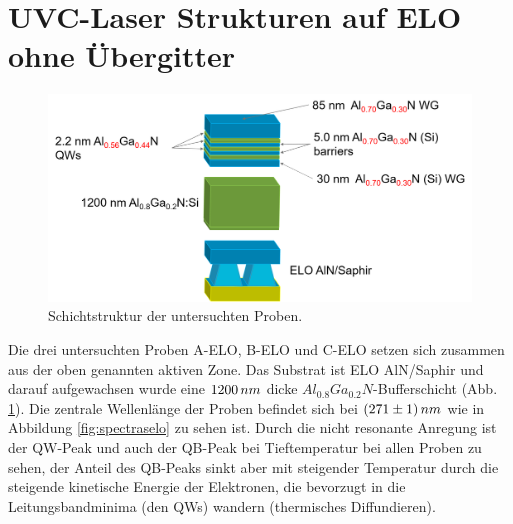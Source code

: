 \section{UVC-Laser Strukturen auf ELO ohne Übergitter}
%
\begin{figure}[h]
\includegraphics[width=\linewidth]{Bilder/TS4045/ts4045.png}
\caption{Schichtstruktur der untersuchten Proben.}
\label{fig:schichtenelo}
\end{figure}
\noindent 
%
Die drei untersuchten Proben A-ELO, B-ELO und C-ELO setzen sich zusammen aus der oben genannten aktiven Zone. Das Substrat ist ELO AlN/Saphir und darauf aufgewachsen wurde eine $1200 \thinspace nm$ dicke $ Al_{0.8}Ga_{0.2}N$-Bufferschicht (Abb. \ref{fig:schichtenelo}). Die zentrale Wellenlänge der Proben befindet sich bei $(271 \pm 1) \thinspace nm$ wie in Abbildung \ref{fig:spectraselo} zu sehen ist. Durch die nicht resonante Anregung ist der QW-Peak und auch der QB-Peak bei Tieftemperatur bei allen Proben zu sehen, der Anteil des QB-Peaks sinkt aber mit steigender Temperatur durch die steigende kinetische Energie der Elektronen, die bevorzugt in die Leitungsbandminima (den QWs) wandern (thermisches Diffundieren).
%
